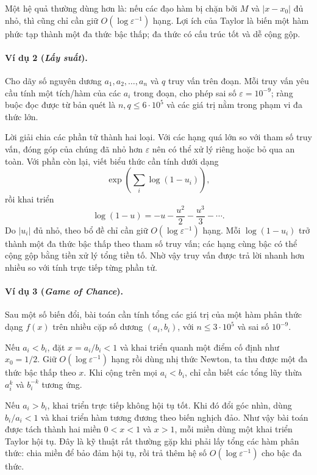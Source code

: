 \documentclass[11pt]{article}
\begin{document}
Một hệ quả thường dùng hơn là: nếu các đạo hàm bị chặn bởi $M$ và
$|x-x_0|$ đủ nhỏ, thì cũng chỉ cần giữ $O(\log\varepsilon^{-1})$ hạng. Lợi ích
của Taylor là biến một hàm phức tạp thành một đa thức bậc thấp; đa thức có cấu
trúc tốt và dễ cộng gộp.

\paragraph{Ví dụ 2 (\emph{Lấy suất}).}
Cho dãy số nguyên dương $a_1,a_2,\ldots,a_n$ và $q$ truy vấn trên đoạn. Mỗi
truy vấn yêu cầu tính một tích/hàm của các $a_i$ trong đoạn, cho phép sai số
$\varepsilon=10^{-9}$; ràng buộc đọc được từ bản quét là
$n,q\le6\cdot10^5$ và các giá trị nằm trong phạm vi đa thức lớn.

Lời giải chia các phần tử thành hai loại. Với các hạng quá lớn so với tham số
truy vấn, đóng góp của chúng đã nhỏ hơn $\varepsilon$ nên có thể xử lý riêng
hoặc bỏ qua an toàn. Với phần còn lại, viết biểu thức cần tính dưới dạng
\[
  \exp\!\left(\sum_i \log(1-u_i)\right),
\]
rồi khai triển
\[
  \log(1-u)=-u-\frac{u^2}{2}-\frac{u^3}{3}-\cdots .
\]
Do $|u_i|$ đủ nhỏ, theo bổ đề chỉ cần giữ $O(\log\varepsilon^{-1})$ hạng.
Mỗi $\log(1-u_i)$ trở thành một đa thức bậc thấp theo tham số truy vấn; các
hạng cùng bậc có thể cộng gộp bằng tiền xử lý tổng tiền tố. Nhờ vậy truy vấn
được trả lời nhanh hơn nhiều so với tính trực tiếp từng phần tử.

\paragraph{Ví dụ 3 (\emph{Game of Chance}).}
Sau một số biến đổi, bài toán cần tính tổng các giá trị của một hàm phân thức
dạng $f(x)$ trên nhiều cặp số dương $(a_i,b_i)$, với $n\le3\cdot10^5$ và sai
số $10^{-9}$.

Nếu $a_i<b_i$, đặt $x=a_i/b_i<1$ và khai triển quanh một điểm cố định như
$x_0=1/2$. Giữ $O(\log\varepsilon^{-1})$ hạng rồi dùng nhị thức Newton, ta thu
được một đa thức bậc thấp theo $x$. Khi cộng trên mọi $a_i<b_i$, chỉ cần biết
các tổng lũy thừa $a_i^k$ và $b_i^{-k}$ tương ứng.

Nếu $a_i>b_i$, khai triển trực tiếp không hội tụ tốt. Khi đó đổi góc nhìn, dùng
$b_i/a_i<1$ và khai triển hàm tương đương theo biến nghịch đảo. Như vậy bài
toán được tách thành hai miền $0<x<1$ và $x>1$, mỗi miền dùng một khai triển
Taylor hội tụ. Đây là kỹ thuật rất thường gặp khi phải lấy tổng các hàm phân
thức: chia miền để bảo đảm hội tụ, rồi trả thêm hệ số
$O(\log\varepsilon^{-1})$ cho bậc đa thức.
\end{document}
